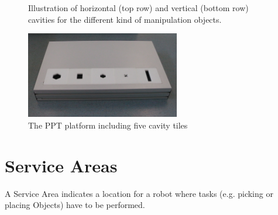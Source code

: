 \begin{figure} [h!]
\begin{center}
		 \hspace{0.1cm}
		  \hspace{0.1cm}
		  \hspace{0.1cm}
	\end{center}
	\caption{Illustration of horizontal (top row) and vertical (bottom row) cavities for the different kind of manipulation objects.}
	\label{fig:ppt_tiles}
\end{figure}


\begin{figure}
	\centering
	\includegraphics[width=0.6\textwidth ]{./images/ppt_plattform.jpg}
	\caption{The PPT platform including five cavity tiles}
	\label{fig:ppt_table}
\end{figure}

\clearpage

\section{Service Areas}
\label{sec:Service_Areas}
A Service Area indicates a location for a robot where tasks (e.g. picking or placing Objects) have to be performed.
